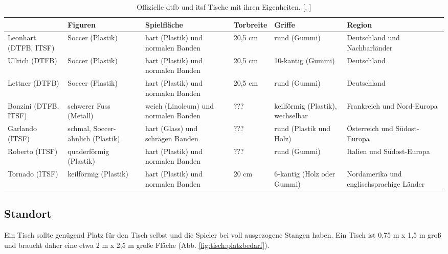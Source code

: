   {\small
\begin{center} 
\begin{table} 
    \begin{tabular}{ p{1.5cm}||p{2cm}|p{2cm}|p{1.5cm}|p{2cm}|p{2cm}} 
 	& Figuren & Spielfläche & Torbreite & Griffe & Region \\ 
\hline 
\hline 
Leonhart (DTFB, ITSF) & Soccer (Plastik) & hart (Plastik) und normalen Banden & 20,5 cm & rund (Gummi) & Deutschland und Nachbarländer \\ 
\hline 
Ullrich  (DTFB) &  Soccer (Plastik) &  hart (Plastik) und normalen Banden & 20,5 cm & 10-kantig (Gummi) & Deutschland \\ 
\hline 
Lettner (DTFB)  & Soccer (Plastik)  &  hart (Plastik) und normalen Banden & 20,5 cm & rund (Gummi) & Deutschland \\ 
\hline 
Bonzini (DTFB, ITSF)  & schwerer Fuss (Metall) & weich (Linoleum) und normalen Banden & ??? & keilförmig (Plastik), wechselbar & Frankreich und Nord-Europa \\ 
\hline 
Garlando (ITSF)  & schmal, Soccer-ähnlich (Plastik) &  hart (Glass) und schrägen Banden & ??? & rund (Plastik und Holz) & Österreich und Südost-Europa \\ 
\hline 
Roberto (ITSF) & quaderförmig (Plastik) &  hart (Plastik) und normalen Banden & ??? & rund (Gummi) & Italien und Südost-Europa \\ 
\hline 
Tornado (ITSF)  & keilförmig (Plastik) &  hart (Plastik) und normalen Banden & 20 cm  & 6-kantig (Holz oder Gummi) & Nordamerika und englischsprachige Länder \\ 
\end{tabular} 
\caption{Offizielle \gls{dtfb} und \gls{itsf} Tische mit ihren Eigenheiten. [\cite{www:kickerbau}, \cite{www:tischfussball-online}]}
\label{tab:tische}
\end{table} 
\end{center}
}



\subsection{Standort}
\label{tisch:tisch:standort}




Ein Tisch sollte genügend Platz für den Tisch selbst und die Spieler bei voll ausgezogene Stangen haben. Ein Tisch ist  0,75 m x 1,5 m groß und braucht daher eine etwa 2 m x 2,5 m große Fläche (Abb. \ref{fig:tisch:platzbedarf}).

